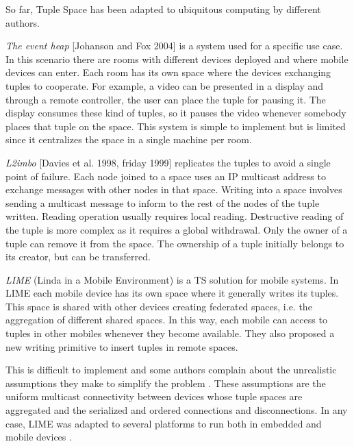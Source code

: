 So far, Tuple Space has been adapted to ubiquitous computing by different authors.




\emph{The event heap} [Johanson and Fox 2004] is a system used for a specific use case. %
In this scenario there are rooms with different devices deployed and where mobile devices can enter.
Each room has its own space where the devices exchanging tuples to cooperate.
For example, a video can be presented in a display and through a remote controller, the user can place the tuple for pausing it.
The display consumes these kind of tuples, so it pauses the video whenever somebody places that tuple on the space.
This system is simple to implement but is limited since it centralizes the space in a single machine per room. %


\emph{L2imbo} [Davies et al. 1998, friday 1999] replicates the tuples to avoid a single point of failure. %
Each node joined to a space uses an IP multicast address to exchange messages with other nodes in that space.
Writing into a space involves sending a multicast message to inform to the rest of the nodes of the tuple written.
Reading operation usually requires local reading.
Destructive reading of the tuple is more complex as it requires a global withdrawal.
Only the owner of a tuple can remove it from the space.
The ownership of a tuple initially belongs to its creator, but can be transferred. %


\emph{LIME} (Linda in a Mobile Environment) \cite{picco_lime:_1999} is a TS solution for mobile systems.
In LIME each mobile device has its own space where it generally writes its tuples.
This space is shared with other devices creating federated spaces, i.e. the aggregation of different shared spaces.
In this way, each mobile can access to tuples in other mobiles whenever they become available.
They also proposed a new writing primitive to insert tuples in remote spaces.

This is difficult to implement and some authors complain about the unrealistic assumptions they make to simplify the problem \cite{coulouris_distributed_2012}. %
These assumptions are the uniform multicast connectivity between devices whose tuple spaces are aggregated and the serialized and ordered connections and disconnections.
In any case, LIME was adapted to several platforms to run both in embedded and mobile devices \cite{murphy_transiently_2006}.


